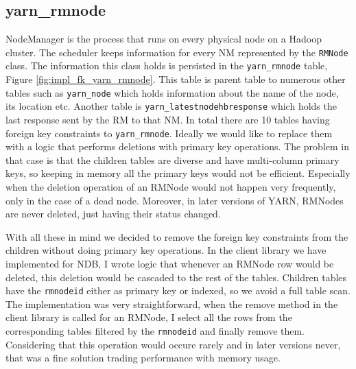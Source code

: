 \subsection{yarn\_rmnode}
\label{ssec:impl_fk_rmnode}
NodeManager is the process that runs on every physical node on a
Hadoop cluster. The scheduler keeps information for every NM
represented by the \texttt{RMNode} class. The information this
class holds is persisted in the \texttt{yarn\_rmnode} table, Figure
\ref{fig:impl_fk_yarn_rmnode}. This table is parent table to
numerous other tables such as \texttt{yarn\_node} which holds
information about the name of the node, its location etc. Another
table is
\texttt{yarn\_latestnodehbresponse} which holds the last response sent
by the RM to that NM. In total there are 10 tables having foreign key
constraints to \texttt{yarn\_rmnode}. Ideally we would like to replace
them with a logic that performs deletions with primary key
operations. The problem in that case is that the children tables are
diverse and have multi-column primary keys, so keeping in memory all
the primary keys would not be efficient. Especially when the deletion
operation of an RMNode would not happen very frequently, only in the case
of a dead node. Moreover, in later versions of YARN, RMNodes are never
deleted, just having their status changed.

With all these in mind we decided to remove the foreign key
constraints from the children without doing primary key
operations. In the client library we have implemented for NDB,
I wrote logic that whenever an RMNode row would be deleted, this
deletion would be cascaded to the rest of the tables. Children tables
have the \texttt{rmnodeid} either as primary key or indexed, so we
avoid a full table scan. The implementation was very straightforward,
when the remove method in the client library is called for an RMNode,
I select all the rows from the corresponding tables filtered by the
\texttt{rmnodeid} and finally remove them. Considering that this
operation would occure rarely and in later versions never, that was a
fine solution trading performance with memory usage.

